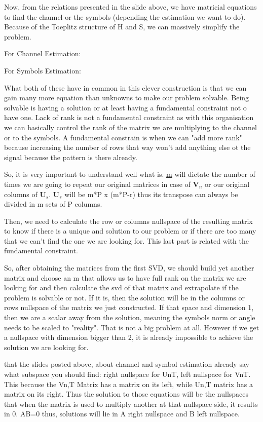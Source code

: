 \documentclass[12pt, a4paper]{article}
\begin{document}
Now, from the relations presented in the slide above, we have matricial equations to find the channel or the symbols (depending the estimation we want to do). Because of the Toeplitz structure of H and S, we can massively simplify the problem. 

For Channel Estimation:


For Symbols Estimation:


What both of these have in common in this clever construction is that we can gain many more equation than unknowns to make our problem solvable. Being solvable is having a solution or at least having a fundamental constraint not o have one. Lack of rank is not a fundamental constraint as with this organisation we can basically control the rank of the matrix we are multiplying to the channel or to the symbols. A fundamental constrain is when we can "add more rank" because increasing the number of rows that way won't add anything else ot the signal because the pattern is there already. 

So, it is very important to understand well what \uline{} is. \uline{m} will dictate the number of times we are going to repeat our original matrices in case of $\mathbf{V}_n$ or our original columns of $\mathbf{U}_s$. $\mathbf{U}_s$ will be m*P x (m*P-r) thus its transpose can always be divided in m sets of P columns.

Then, we need to calculate the row or columns nullspace of the resulting matrix to know if there is a unique and solution to our problem or if there are too many that we can't find the one we are looking for. This last part is related with the fundamental constraint.


So, after obtaining the matrices from the first SVD, we should build yet another matrix and choose an m that allows us to have full rank on the matrix we are looking for and then calculate the svd of that matrix and extrapolate if the problem is solvable or not. If it is, then the solution will be in the columns or rows nullspace of the matrix we just constructed. If that space and dimension 1, then we are a scalar away from the solution, meaning the symbols norm or angle needs to be scaled to "reality". That is not a big problem at all. However if we get a nullspace with dimension bigger than 2, it is already impossible to achieve the solution we are looking for.


 that the slides posted above, about channel and symbol estimation already say what subspace you should find: right nullspace for UnT, left nullspace for VnT. This because the Vn,T Matrix has a matrix on its left, while Un,T matrix has a matrix on its right. Thus the solution to those equations will be the nullspaces that when the matrix is used to multiply another at that nullspace side, it results in 0. AB=0 thus, solutions will lie in A right nullspace and B left nullspace.
\end{document}
